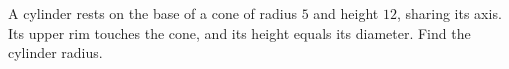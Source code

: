 A cylinder rests on the base of a cone of radius $5$ and height $12$, sharing its axis. Its upper rim touches the cone, and its height equals its diameter. Find the cylinder radius.
